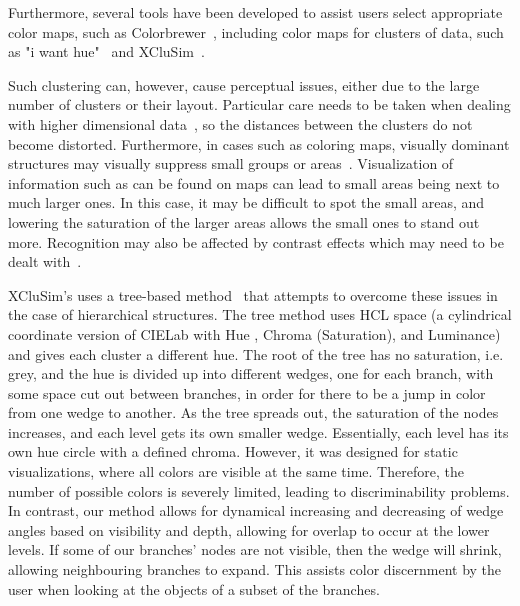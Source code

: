 \documentclass[review,journal]{vgtc}         %
\begin{document}
Furthermore, several tools have been developed to assist users select appropriate color maps, such as Colorbrewer~\cite{harrower2003colorbrewer}, including color maps for clusters of data, such as "i want hue"~\cite{iwanthue} and XCluSim~\cite{l2015xclusim}. 

Such clustering can, however, cause perceptual issues, either due to the large number of clusters or their layout. 
Particular care needs to be taken when dealing with higher dimensional data~\cite{mittelstiidt2014revisiting}, so the distances between the clusters do not become distorted. 
Furthermore, in cases such as coloring maps, visually dominant structures may visually suppress small groups or areas~\cite{lee2013perceptually}.
Visualization of information such as can be found on maps can lead to small areas being next to much larger ones. 
In this case, it may be difficult to spot the small areas, and lowering the saturation of the larger areas allows the small ones to stand out more.
Recognition may also be affected by contrast effects which may need to be dealt with~\cite{mittelstadt2014methods}. 


XCluSim’s uses a tree-based method~\cite{tennekes2014tree} that attempts to overcome these issues in the case of hierarchical structures. 
The tree method uses HCL space (a cylindrical coordinate version of CIELab with Hue , Chroma (Saturation), and Luminance) and gives each cluster a different hue. 
The root of the tree has no saturation, i.e. grey, and the hue is divided up into different wedges, one for each branch, with some space cut out between branches, in order for there to be a jump in color from one wedge to another. 
As the tree spreads out, the saturation of the nodes increases, and each level gets its own smaller wedge. 
Essentially, each level has its own hue circle with a defined chroma. 
However, it was designed for static visualizations, where all colors are visible at the same time. Therefore, the number of possible colors is severely limited, leading to discriminability problems.
In contrast, our method allows for dynamical increasing and decreasing of wedge angles based on visibility and depth, allowing for overlap to occur at the lower levels. 
If some of our branches' nodes are not visible, then the wedge will shrink, allowing neighbouring branches to expand. 
This assists color discernment by the user when looking at the objects of a subset of the branches.
\end{document}
